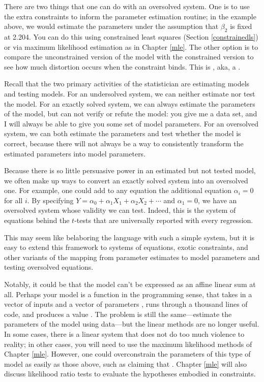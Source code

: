 There are two things that one can do with an oversolved system. One is
to use the extra constraints to inform the parameter estimation routine;
in the example above, we would estimate the parameters under the
assumption that $\beta_2$ is fixed at 2.204.
You can do this using constrained least squares (Section
\ref{constrainedls}) or via maximum likelihood estimation as in Chapter
\ref{mle}. The other option is to compare the unconstrained version of
the model with the constrained version to see how much distortion occurs
when the constraint binds. This is , aka,
a .

Recall that the two primary activities of the statistician are estimating
models and testing models.  For an undersolved system, we can neither
estimate nor test the model. For an exactly solved system, we can always
estimate the parameters of the model, but can not verify or refute the
model: you give me a data set, and I will always be able to give you
some set of model parameters. For an oversolved system, we can both
estimate the parameters and test whether the model is correct, because
there will not always be a way to consistently transform the estimated
parameters into model parameters.

Because there is so little persuasive power in an estimated but not
tested model, we often make up
ways to convert an exactly solved system into an oversolved one.
For example, one could add to any equation the additional equation
$\alpha_i = 0$ for all $i$.
By specifying
$Y = \alpha_0 + \alpha_1 X_1 + \alpha_2 X_2 + \cdots$ and $\alpha_1=0$,
we have an oversolved system whose validity we can test. Indeed, this
is the system of equations behind the $t$-tests that are universally
reported with every regression.

This may seem like belaboring the language with such a simple system,
but it is easy to extend this framework to systems of equations, 
exotic constraints, and other variants of the mapping from parameter
estimates to model parameters and testing oversolved equations.

Notably, it could be that the model can't be expressed as an affine
linear sum at all. Perhaps your model is a function in the programming
sense, that takes in a vector of inputs  and a
vector of parameters , runs
through a thousand lines of code, and produces a value . The
problem is still the same---estimate the parameters of the model using
data---but the linear methods are no longer useful. In some cases, there
is a linear system that does not do too much violence to reality; in
other cases, you will need to use the maximum likelihood methods of
Chapter \ref{mle}. However, one could overconstrain the parameters of
this type of model as easily as those above, such as claiming that
. Chapter \ref{mle} will also discuss likelihood
ratio tests to evaluate the hypotheses embodied in constraints.

